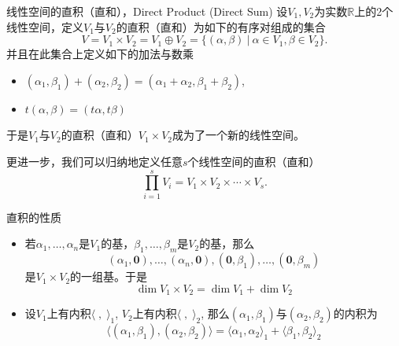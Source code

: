 \begin{frame}

\begin{block}{线性空间的直积（直和），Direct Product (Direct Sum)}
设$V_1,V_2$为实数$\mathbb{R}$上的2个线性空间，定义$V_1$与$V_2$的直积（直和）为如下的有序对组成的集合
$$V = V_1\times V_2 = V_1\oplus V_2 = \{ (\alpha, \beta) \ |\ \alpha \in V_1, \beta \in V_2\}.$$
并且在此集合上定义如下的加法与数乘
\begin{itemize}
\item $(\alpha_1, \beta_1) + (\alpha_2, \beta_2) = (\alpha_1 + \alpha_2, \beta_1 + \beta_2)$,
\item $t (\alpha, \beta) = (t\alpha, t\beta)$
\end{itemize}
于是$V_1$与$V_2$的直积（直和）$V_1\times V_2$成为了一个新的线性空间。

\pause
\vspace{2em}

更进一步，我们可以归纳地定义任意$s$个线性空间的直积（直和）
$$\prod_{i=1}^s V_i = V_1 \times V_2 \times \cdots \times V_s.$$
\end{block}

\end{frame}


\begin{frame}

\begin{block}{直积的性质}
\begin{itemize}
\item 若$\alpha_1,\ldots,\alpha_n$是$V_1$的基，$\beta_1,\ldots,\beta_m$是$V_2$的基，那么
$$(\alpha_1,\mathbf{0}),\ldots,(\alpha_n,\mathbf{0}),(\mathbf{0},\beta_1),\ldots,(\mathbf{0},\beta_m)$$
是$V_1\times V_2$的一组基。于是
$$\dim V_1\times V_2 = \dim V_1 + \dim V_2$$
\item 设$V_1$上有内积$\langle \;,\; \rangle_1$, $V_2$上有内积$\langle \;,\; \rangle_2$, 那么$(\alpha_1,\beta_1)$与$(\alpha_2,\beta_2)$的内积为
$$\langle (\alpha_1,\beta_1), (\alpha_2,\beta_2) \rangle = \langle \alpha_1, \alpha_2 \rangle_1 + \langle \beta_1, \beta_2 \rangle_2$$
\end{itemize}
\end{block}

\end{frame}


